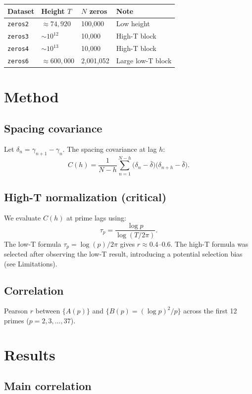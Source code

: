 \documentclass[11pt]{article}
\begin{document}
\begin{center}
\begin{tabular}{llll}
\toprule
Dataset & Height $T$ & $N$ zeros & Note \\
\midrule
\texttt{zeros2} & $\approx 74{,}920$ & 100,000 & Low height \\
\texttt{zeros3} & $\sim 10^{12}$     &  10,000 & High-T block \\
\texttt{zeros4} & $\sim 10^{13}$     &  10,000 & High-T block \\
\texttt{zeros6} & $\approx 600{,}000$ & 2,001,052 & Large low-T block \\
\bottomrule
\end{tabular}
\end{center}

\section{Method}

\subsection{Spacing covariance}
Let $\delta_n = \gamma_{n+1} - \gamma_n$. The spacing covariance at lag $h$:
\[
  C(h) = \frac{1}{N-h}\sum_{n=1}^{N-h}
  \bigl(\delta_n - \bar\delta\bigr)\bigl(\delta_{n+h} - \bar\delta\bigr).
\]

\subsection{High-T normalization (critical)}
We evaluate $C(h)$ at prime lags using:
\[
  \tau_p = \frac{\log p}{\log(T/2\pi)}.
\]
The low-T formula $\tau_p = \log(p)/2\pi$ gives $r \approx 0.4$--$0.6$.
The high-T formula was selected after observing the low-T result,
introducing a potential selection bias (see Limitations).

\subsection{Correlation}
Pearson $r$ between $\{A(p)\}$ and $\{B(p) = (\log p)^2/p\}$
across the first 12 primes ($p = 2,3,\ldots,37$).

\section{Results}

\subsection{Main correlation}
\end{document}
